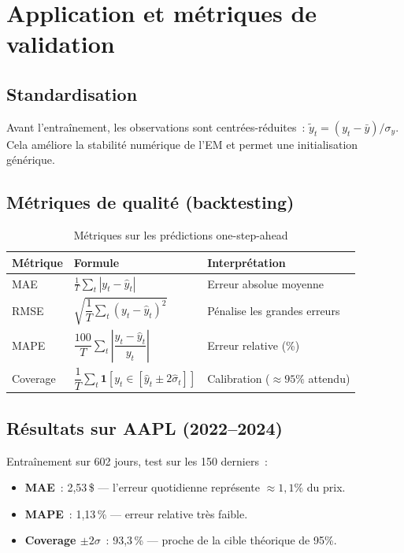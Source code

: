 \documentclass[11pt,a4paper]{article}
\begin{document}
\section{Application et métriques de validation}

\subsection{Standardisation}

Avant l'entraînement, les observations sont centrées-réduites~:
$\tilde{y}_t = (y_t - \bar{y})/\sigma_y$. Cela améliore la stabilité
numérique de l'EM et permet une initialisation générique.

\subsection{Métriques de qualité (backtesting)}

\begin{table}[h]
\centering
\caption{Métriques sur les prédictions one-step-ahead}
\renewcommand{\arraystretch}{1.3}
\begin{tabular}{@{}llp{6cm}@{}}
\toprule
Métrique & Formule & Interprétation \\
\midrule
MAE  & $\frac{1}{T}\displaystyle\sum_t |y_t - \hat{y}_t|$
     & Erreur absolue moyenne \\
RMSE & $\sqrt{\dfrac{1}{T}\displaystyle\sum_t (y_t - \hat{y}_t)^2}$
     & Pénalise les grandes erreurs \\
MAPE & $\dfrac{100}{T}\displaystyle\sum_t \left|\dfrac{y_t - \hat{y}_t}{y_t}\right|$
     & Erreur relative (\%) \\
Coverage & $\dfrac{1}{T}\displaystyle\sum_t
           \mathbf{1}\!\left[y_t \in [\hat{y}_t\pm 2\hat\sigma_t]\right]$
         & Calibration ($\approx 95\%$ attendu) \\
\bottomrule
\end{tabular}
\end{table}

\subsection{Résultats sur AAPL (2022--2024)}

Entraînement sur 602 jours, test sur les 150 derniers~:
\begin{itemize}
  \item \textbf{MAE}~: 2{,}53\,\$ \;---\; l'erreur quotidienne représente $\approx 1{,}1\%$ du prix.
  \item \textbf{MAPE}~: 1{,}13\,\% \;---\; erreur relative très faible.
  \item \textbf{Coverage $\pm 2\sigma$}~: 93{,}3\,\% \;---\; proche de la cible théorique de 95\%.
\end{itemize}
\end{document}
